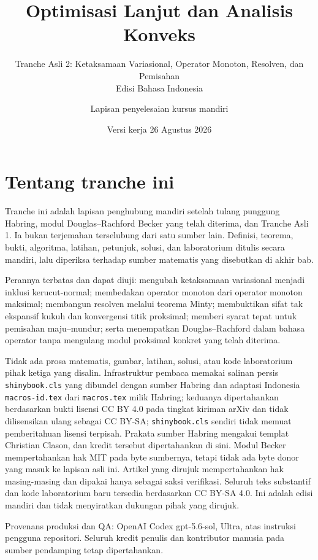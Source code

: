 \documentclass[indonesian]{shinybook}
\title{Optimisasi Lanjut dan Analisis Konveks}
\subtitle{Tranche Asli 2: Ketaksamaan Variasional, Operator Monoton, Resolven, dan Pemisahan\\Edisi Bahasa Indonesia}
\author{Lapisan penyelesaian kursus mandiri}
\date{Versi kerja 26 Agustus 2026}
\begin{document}
\maketitle

\frontmatter
\chapter*{Tentang tranche ini}
Tranche ini adalah lapisan penghubung mandiri setelah tulang punggung Habring,
modul Douglas--Rachford Becker yang telah diterima, dan Tranche Asli 1. Ia
bukan terjemahan terselubung dari satu sumber lain. Definisi, teorema, bukti,
algoritma, latihan, petunjuk, solusi, dan laboratorium ditulis secara mandiri,
lalu diperiksa terhadap sumber matematis yang disebutkan di akhir bab.

Perannya terbatas dan dapat diuji: mengubah ketaksamaan variasional menjadi
inklusi kerucut-normal; membedakan operator monoton dari operator monoton
maksimal; membangun resolven melalui teorema Minty; membuktikan sifat tak
ekspansif kukuh dan konvergensi titik proksimal; memberi syarat tepat untuk
pemisahan maju--mundur; serta menempatkan Douglas--Rachford dalam bahasa
operator tanpa mengulang modul proksimal konkret yang telah diterima.

Tidak ada prosa matematis, gambar, latihan, solusi, atau kode laboratorium
pihak ketiga yang disalin. Infrastruktur pembaca memakai salinan persis
\texttt{shinybook.cls} yang dibundel dengan sumber Habring dan adaptasi
Indonesia \texttt{macros-id.tex} dari \texttt{macros.tex} milik Habring;
keduanya dipertahankan berdasarkan bukti lisensi CC BY 4.0 pada tingkat
kiriman arXiv dan tidak dilisensikan ulang sebagai CC BY-SA;
\texttt{shinybook.cls} sendiri tidak memuat pemberitahuan lisensi terpisah.
Prakata sumber Habring mengakui templat Christian Clason, dan kredit tersebut
dipertahankan di sini. Modul Becker mempertahankan hak MIT pada byte sumbernya,
tetapi tidak ada byte donor yang masuk ke lapisan asli ini. Artikel yang
dirujuk mempertahankan hak masing-masing dan dipakai hanya sebagai saksi
verifikasi. Seluruh teks substantif dan kode laboratorium baru tersedia
berdasarkan CC BY-SA 4.0. Ini adalah edisi mandiri dan tidak menyiratkan
dukungan pihak yang dirujuk.

Provenans produksi dan QA: OpenAI Codex gpt-5.6-sol, Ultra, atas instruksi
pengguna repositori. Seluruh kredit penulis dan kontributor manusia pada
sumber pendamping tetap dipertahankan.

\tableofcontents
\mainmatter

\end{document}
